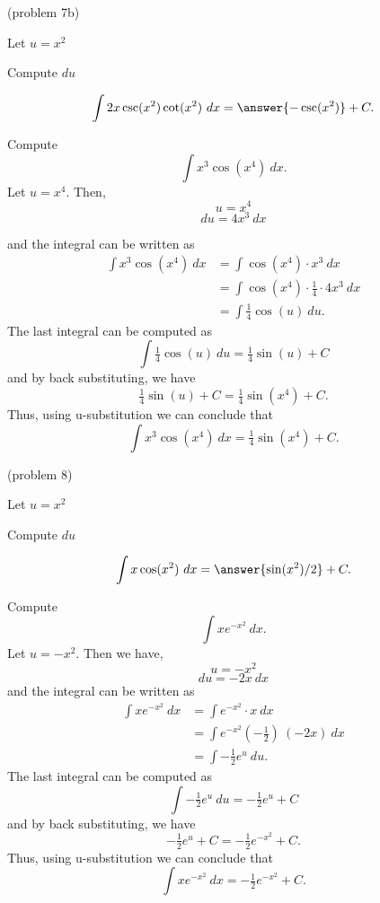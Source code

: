 \documentclass{ximera}
\begin{document}
\begin{problem}(problem 7b)
\begin{hint}
Let $u = x^2$
\end{hint}
\begin{hint}
Compute $du$
\end{hint}
\[\int 2x\csc(x^2)\cot(x^2) \ dx = \answer{-\csc(x^2)} +C.\]
\end{problem}

\begin{example}[example 8] Compute 
\[\int x^3\cos(x^4) \ dx.\]
Let $u = x^4$.  Then,
\[u = x^4\]
\[du = 4x^3 \ dx\]

and the integral can be written as 
\begin{align*}
\int x^3\cos(x^4) \ dx &= \int \cos(x^4) \cdot x^3\  dx \\
&=  \int \cos(x^4)\cdot \tfrac14 \cdot 4x^3\  dx\\
&=  \int \tfrac14\cos(u) \ du.
\end{align*}
The last integral can be computed as 
\[\int \tfrac14 \cos(u) \ du = \tfrac14 \sin(u) + C\]
and by back substituting, we have 
\[\tfrac14 \sin(u) + C = \tfrac14 \sin(x^4) + C.\]
Thus, using u-substitution we can conclude that
\[\int x^3\cos(x^4) \ dx =  \tfrac14 \sin(x^4) + C.\]
\end{example}

\begin{problem}(problem 8)
\begin{hint}
Let $u = x^2$
\end{hint}
\begin{hint}
Compute $du$
\end{hint}
\[\int x\cos(x^2) \ dx = \answer{\sin(x^2)/2} +C.\]
\end{problem}


\begin{example}[example 9] Compute 
\[\int xe^{-x^2} \ dx.\]
Let $u = -x^2 $.  Then we have,
\[u = -x^2\]
\[du = -2x \ dx\]
and the integral can be written as
\begin{align*}
\int xe^{-x^2} \ dx &= \int e^{-x^2} \cdot x\  dx \\
&=  \int e^{-x^2}( -\tfrac12)\ (-2x)\  dx \\
&=  \int -\tfrac12 e^u \ du.
\end{align*}
The last integral can be computed as 
\[ \int -\tfrac12 e^u \ du = -\tfrac12 e^u + C\]
and by back substituting, we have 
\[-\tfrac12 e^u + C = -\tfrac12 e^{-x^2} + C.\]
Thus, using u-substitution we can conclude that
\[\int xe^{-x^2} \ dx =  -\tfrac12 e^{-x^2} + C.\]
\end{example}
\end{document}
